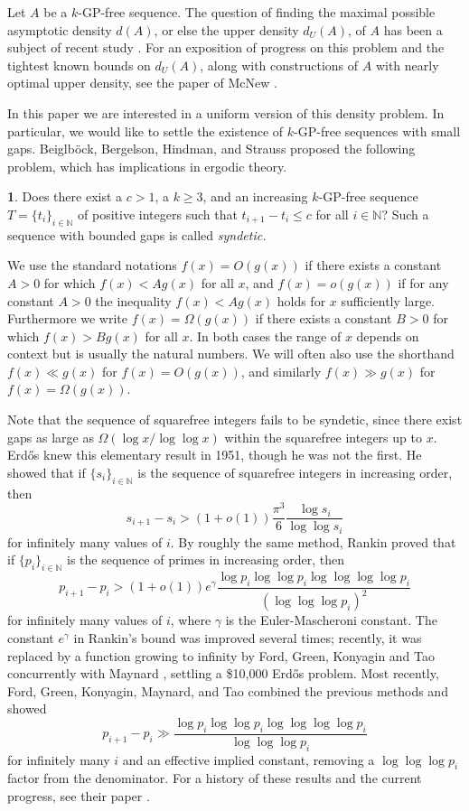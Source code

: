 \documentclass[12pt,english,BCOR7.5mm]{amsart}
\numberwithin{equation}{section}
\numberwithin{figure}{section}
\theoremstyle{definition}
\newtheorem*{problem*}{\protect\problemname}
\theoremstyle{plain}
\theoremstyle{plain}
\theoremstyle{plain}
\theoremstyle{definition}
\theoremstyle{plain}
\theoremstyle{plain}
\providecommand{\problemname}{Problem}
\begin{document}
Let $A$ be a $k$-GP-free sequence. The question of finding the maximal
possible asymptotic density $d(A)$, or else the upper density $d_{U}(A)$,
of $A$ has been a subject of recent study \cite{BBHS,BG,McNew,NO,Riddell}.
For an exposition of progress on this problem and the tightest known
bounds on $d_{U}(A)$, along with constructions of $A$ with nearly
optimal upper density, see the paper of McNew \cite{McNew}.

In this paper we are interested in a uniform version of this density
problem. In particular, we would like to settle the existence of $k$-GP-free
sequences with small gaps. Beiglböck, Bergelson, Hindman, and Strauss
\cite{BBHS} proposed the following problem, which has implications
in ergodic theory.
\begin{problem*}
Does there exist a $c>1$, a $k\geq3$, and an increasing $k$-GP-free
sequence $T=\{t_{i}\}_{i\in\mathbb{N}}$ of positive integers such
that $t_{i+1}-t_{i}\leq c$ for all $i\in\mathbb{N}$? Such a sequence
with bounded gaps is called \emph{syndetic.}
\end{problem*}
We use the standard notations $f(x)=O(g(x))$ if there exists a constant
$A>0$ for which $f(x)<Ag(x)$ for all $x$, and $f(x)=o(g(x))$ if
for any constant $A>0$ the inequality $f(x)<Ag(x)$ holds for $x$
sufficiently large. Furthermore we write $f(x)=\Omega(g(x))$ if there
exists a constant $B>0$ for which $f(x)>Bg(x)$ for all $x$. In
both cases the range of $x$ depends on context but is usually the
natural numbers. We will often also use the shorthand $f(x)\ll g(x)$
for $f(x)=O(g(x))$, and similarly $f(x)\gg g(x)$ for $f(x)=\Omega(g(x))$. 

Note that the sequence of squarefree integers fails to be syndetic,
since there exist gaps as large as $\Omega(\log x/\log\log x)$ within
the squarefree integers up to $x$. Erd\H{o}s \cite{Erdos} knew this
elementary result in 1951, though he was not the first. He showed
that if $\{s_{i}\}_{i\in\mathbb{N}}$ is the sequence of squarefree
integers in increasing order, then
\[
s_{i+1}-s_{i}>(1+o(1))\frac{\pi^{3}}{6}\frac{\log s_{i}}{\log\log s_{i}}
\]
for infinitely many values of $i$. By roughly the same method, Rankin
\cite{Rankin2} proved that if $\{p_{i}\}_{i\in\mathbb{N}}$ is the
sequence of primes in increasing order, then 
\[
p_{i+1}-p_{i}>(1+o(1))e^{\gamma}\frac{\log p_{i}\log\log p_{i}\log\log\log\log p_{i}}{(\log\log\log p_{i})^{2}}
\]
for infinitely many values of $i$, where $\gamma$ is the Euler-Mascheroni
constant. The constant $e^{\gamma}$ in Rankin's bound was improved
several times; recently, it was replaced by a function growing to
infinity by Ford, Green, Konyagin and Tao \cite{FGKT} concurrently
with Maynard \cite{Maynard}, settling a \$10,000 Erd\H{o}s problem.
Most recently, Ford, Green, Konyagin, Maynard, and Tao combined the
previous methods and showed
\[
p_{i+1}-p_{i}\gg\frac{\log p_{i}\log\log p_{i}\log\log\log\log p_{i}}{\log\log\log p_{i}}
\]
for infinitely many $i$ and an effective implied constant, removing
a $\log\log\log p_{i}$ factor from the denominator. For a history
of these results and the current progress, see their paper \cite{FGKMT}.
\end{document}
